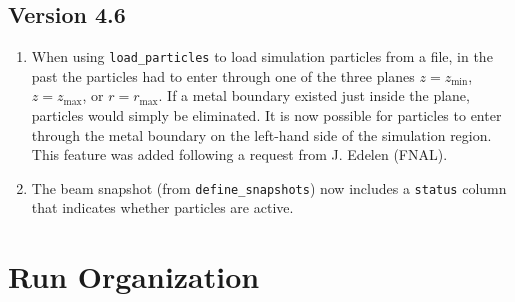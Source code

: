 \documentclass[11pt]{article}
\begin{document}
\subsection{Version 4.6} 
\begin{enumerate}
\item When using \verb|load_particles| to load simulation particles from a file, in the past the
  particles had to enter through one of the three planes $z=z_{\textrm{min}}$, $z=z_{\textrm{max}}$, or
  $r=r_{\textrm{max}}$. If a metal boundary existed just inside the plane, particles would simply be
  eliminated. It is now possible for particles to enter through the metal boundary on the left-hand
  side of the simulation region. This feature was added following a request from J. Edelen (FNAL).
\item The beam snapshot (from \verb|define_snapshots|) now includes a \verb|status| column that
  indicates whether particles are active.
\end{enumerate}

\section{Run Organization}
\end{document}
